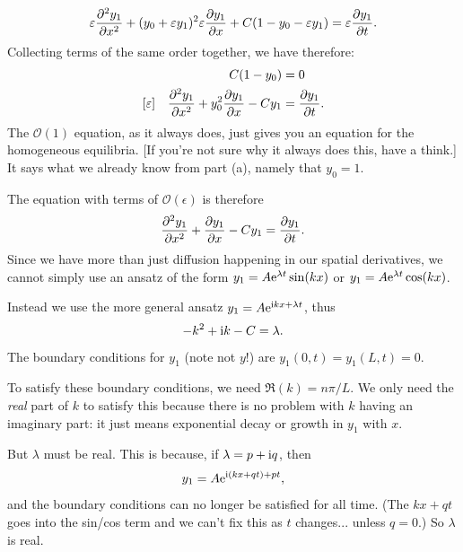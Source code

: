 \documentclass[a4paper, 12pt]{article}
\begin{document}
\begin{enumerate}[label={\bf \arabic{*}.\;}, ref={\arabic{*}},itemsep=3ex, left=0ex]
{\begin{enumerate}[label=(\alph*)]
{            \begin{equation}
              \epsilon \pdd{y_1}{x}  + (y_0 + \epsilon y_1)^2\epsilon \pd{y_1}{x} +C(1-y_0-\epsilon y_1) = \epsilon \pd{y_1}{t}.
            \end{equation}
            Collecting terms of the same order together, we have therefore:
            \begin{align}
              [1]&&C(1-y_0)&=0\\
              [\epsilon]&&\pdd{y_1}{x} + y_0^2\pd{y_1}{x} -Cy_1 &= \pd{y_1}{t}.
            \end{align}
            The $\mathcal{O}(1)$ equation, as it always does, just gives you an equation for the homogeneous equilibria. [If you're not sure why it always does this, have a think.] It says what we already know from part (a), namely that $y_0=1$.

            The equation with terms of $\mathcal{O}(\epsilon)$ is therefore
            \begin{align}
              \pdd{y_1}{x}  + \pd{y_1}{x} -Cy_1 = \pd{y_1}{t}.
            \end{align}
            Since we have more than just diffusion happening in our spatial derivatives, we cannot simply use an ansatz of the form $y_1 = A\mathrm{e}^{\lambda t} \sin(kx)$ or $y_1 = A\mathrm{e}^{\lambda t} \cos(kx)$.

            Instead we use the more general ansatz $y_1 = A\mathrm{e}^{\mathrm{i} kx +\lambda t}$, thus
            \begin{equation}
              -k^2 + \mathrm{i} k - C = \lambda.
              \label{eq-omega-0}
            \end{equation}
            The boundary conditions for $y_1$ (note not $y$!) are $y_1(0,t)=y_1(L,t)=0$.

            To satisfy these boundary conditions, we need $\Re(k) = n\pi/L$. We only need the \emph{real} part of $k$ to satisfy this because there is no problem with $k$ having an imaginary part: it just means exponential decay or growth in $y_1$ with $x$.

            But $\lambda$ must be real. This is because, if $\lambda = p + \mathrm{i} q$, then
            \begin{equation}
              y_1 = A\mathrm{e}^{\mathrm{i} (kx+qt) + p t},
            \end{equation}
            and the boundary conditions can no longer be satisfied for all time. (The $kx+qt$ goes into the sin/cos term and we can't fix this as $t$ changes... unless $q=0$.) So $\lambda$ is real.

}
\end{enumerate}}
\end{enumerate}
\end{document}
